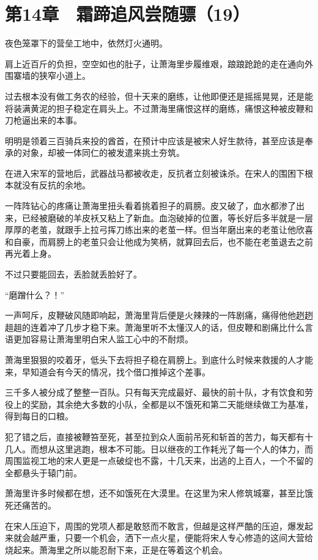 \section{第14章　霜蹄追风尝随骠（19）}

夜色笼罩下的营垒工地中，依然灯火通明。

肩上近百斤的负担，空空如也的肚子，让萧海里步履维艰，踉踉跄跄的走在通向外围寨墙的狭窄小道上。

过去根本没有做工务农的经验，但十天来的磨练，让他即便还是摇摇晃晃，还是能将装满黄泥的担子稳定在肩头上。不过萧海里痛恨这样的磨练，痛恨这种被皮鞭和刀枪逼出来的本事。

明明是领着三百骑兵来投的酋首，在预计中应该是被宋人好生款待，甚至应该是奉承的对象，却被一体同仁的被发遣来挑土夯筑。

在进入宋军的营地后，武器战马都被收走，反抗者立刻被诛杀。在宋人的围困下根本就没有反抗的余地。

一阵阵钻心的疼痛让萧海里扭头看着挑着担子的肩膀。皮又破了，血水都渗了出来，已经被磨破的羊皮袄又粘上了新血。血泡破掉的位置，等长好后多半就是一层厚厚的老茧，就跟手上拉弓挥刀练出来的老茧一样。但当年磨出来的老茧让他欣喜和自豪，而肩膀上的老茧只会让他成为笑柄，就算回去后，也不能在老茧退去之前再光着上身。

不过只要能回去，丢脸就丢脸好了。

“磨蹭什么？！”

一声呵斥，皮鞭破风随即响起，萧海里背后便是火辣辣的一阵剧痛，痛得他他趔趔趄趄的连着冲了几步才稳下来。萧海里听不太懂汉人的话，但皮鞭和剧痛比什么言语更加容易让萧海里明白宋人监工心中的不耐烦。

萧海里狠狠的咬着牙，低头下去将担子稳在肩膀上。到底什么时候来救援的人才能来，早知道会有今天的情况，找个借口推掉这个差事。

三千多人被分成了整整一百队。只有每天完成最好、最快的前十队，才有饮食和劳役上的奖励，其余绝大多数的小队，全都是以不饿死和第二天能继续做工为基准，得到每日的口粮。

犯了错之后，直接被鞭笞至死，甚至拉到众人面前吊死和斩首的苦力，每天都有十几人。而想从这里逃跑，根本不可能。日以继夜的工作耗光了每一个人的体力，而周围监视工地的宋人更是一点破绽也不露，十几天来，出逃的上百人，一个不留的全都悬头于辕门前。

萧海里许多时候都在想，还不如饿死在大漠里。在这里为宋人修筑城寨，甚至比饿死还痛苦的。

在宋人压迫下，周围的党项人都是敢怒而不敢言，但越是这样严酷的压迫，爆发起来就会越严重，只要一个机会，洒下一点火星，便能将宋人专心修造的这间大营给烧起来。萧海里之所以能忍耐下来，正是在等着这个机会。

